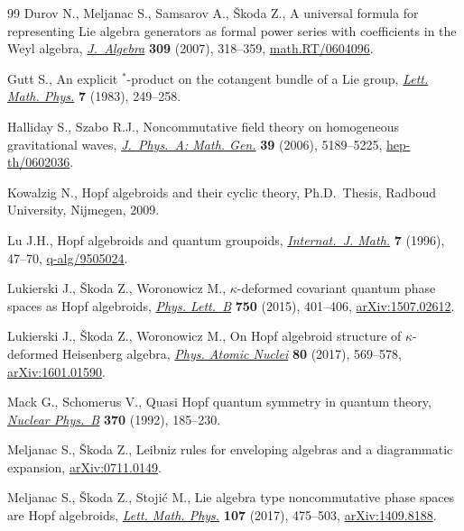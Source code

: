 \begin{thebibliography}{99}
Durov N., Meljanac S., Samsarov A., \v{S}koda Z., A universal formula for
 representing {L}ie algebra generators as formal power series with
 coefficients in the {W}eyl algebra, \href{https://doi.org/10.1016/j.jalgebra.2006.08.025}{\textit{J.~Algebra}} \textbf{309} (2007),
 318--359, \href{https://arxiv.org/abs/math.RT/0604096}{math.RT/0604096}.

Gutt S., An explicit {$^{\ast} $}-product on the cotangent bundle of a {L}ie
 group, \href{https://doi.org/10.1007/BF00400441}{\textit{Lett. Math. Phys.}} \textbf{7} (1983), 249--258.

Halliday S., Szabo R.J., Noncommutative field theory on homogeneous
 gravitational waves, \href{https://doi.org/10.1088/0305-4470/39/18/030}{\textit{J.~Phys.~A: Math. Gen.}} \textbf{39} (2006),
 5189--5225, \href{https://arxiv.org/abs/hep-th/0602036}{hep-th/0602036}.

Kowalzig N., Hopf algebroids and their cyclic theory, Ph.D.~Thesis, Radboud
 University, Nijmegen, 2009.

Lu J.H., Hopf algebroids and quantum groupoids, \href{https://doi.org/10.1142/S0129167X96000050}{\textit{Internat.~J. Math.}}
 \textbf{7} (1996), 47--70, \href{https://arxiv.org/abs/q-alg/9505024}{q-alg/9505024}.

Lukierski J., \v{S}koda Z., Woronowicz M., {$\kappa$}-deformed covariant
 quantum phase spaces as {H}opf algebroids, \href{https://doi.org/10.1016/j.physletb.2015.09.042}{\textit{Phys. Lett.~B}}
 \textbf{750} (2015), 401--406, \href{https://arxiv.org/abs/1507.02612}{arXiv:1507.02612}.

Lukierski J., \v{S}koda Z., Woronowicz M., On {H}opf algebroid structure of
 $\kappa$-deformed {H}eisenberg algebra, \href{https://doi.org/10.1134/S1063778817030188}{\textit{Phys. Atomic Nuclei}}
 \textbf{80} (2017), 569--578, \href{https://arxiv.org/abs/1601.01590}{arXiv:1601.01590}.

Mack G., Schomerus V., Quasi {H}opf quantum symmetry in quantum theory,
 \href{https://doi.org/10.1016/0550-3213(92)90350-K}{\textit{Nuclear Phys.~B}} \textbf{370} (1992), 185--230.

Meljanac S., \v{S}koda Z., Leibniz rules for enveloping algebras and a
 diagrammatic expansion, \href{https://arxiv.org/abs/0711.0149}{arXiv:0711.0149}.

Meljanac S., \v{S}koda Z., Stoji\'c M., Lie algebra type noncommutative phase
 spaces are {H}opf algebroids, \href{https://doi.org/10.1007/s11005-016-0908-9}{\textit{Lett. Math. Phys.}} \textbf{107} (2017),
 475--503, \href{https://arxiv.org/abs/1409.8188}{arXiv:1409.8188}.


\end{thebibliography}
